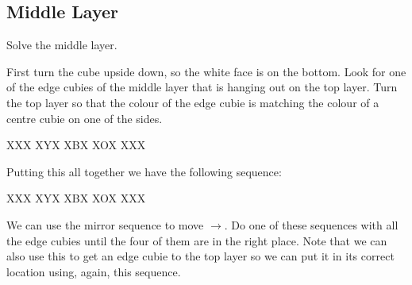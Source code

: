 

\subsection{Middle Layer}

\begin{goal}
    Solve the middle layer.
\end{goal}

First turn the cube upside down, so the white face is on the bottom.
Look for one of the edge cubies of the middle layer that is hanging out on the top layer.
Turn the top layer so that the colour of the edge cubie is matching the colour of a centre cubie on one of the sides.


\RubikFaceUp XXX XYX XBX
\RubikSliceTopR XOX XXX

\notextcube

Putting this all together we have the following sequence:


\RubikFaceUp XXX XYX XBX
\RubikSliceTopR XOX XXX
\notextcube
{}
\notextcube

We can use the mirror sequence to move $\to$.
Do one of these sequences with all the edge cubies until the four of them are in the right place.
Note that we can also use this to get an edge cubie to the top layer so we can put it in its correct location using, again, this sequence.
